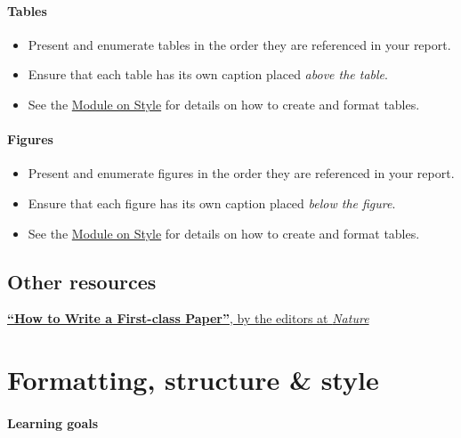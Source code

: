\documentclass[
]{book}
\begin{document}
\hypertarget{tables-2}{%
\subsubsection*{Tables}\label{tables-2}}

\begin{itemize}
\item
  Present and enumerate tables in the order they are referenced in your report.
\item
  Ensure that each table has its own caption placed \emph{above the table}.
\item
  See the \protect\hyperlink{style}{Module on Style} for details on how to create and format tables.
\end{itemize}

\hypertarget{figures-1}{%
\subsubsection*{Figures}\label{figures-1}}

\begin{itemize}
\item
  Present and enumerate figures in the order they are referenced in your report.
\item
  Ensure that each figure has its own caption placed \emph{below the figure}.
\item
  See the \protect\hyperlink{style}{Module on Style} for details on how to create and format tables.
\end{itemize}

\hypertarget{other-resources-8}{%
\section*{Other resources}\label{other-resources-8}}

\href{https://www.nature.com/articles/d41586-018-02404-4}{\textbf{``How to Write a First-class Paper''}, by the editors at \emph{Nature}}

\hypertarget{style}{%
\chapter{Formatting, structure \& style}\label{style}}

\hypertarget{learning-goals-19}{%
\subsubsection*{Learning goals}\label{learning-goals-19}}
\end{document}
